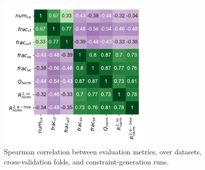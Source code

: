 \begin{figure}[t]
	\centering
	\includegraphics[width=0.66\textwidth, trim=10 10 10 10, clip]{plots/syn-evaluation-metrics-correlation.pdf}
	\caption{Spearman correlation between evaluation metrics, over datasets, cross-validation folds, and constraint-generation runs.}
	\label{fig:syn:evaluation-metrics-correlation}
\end{figure}

